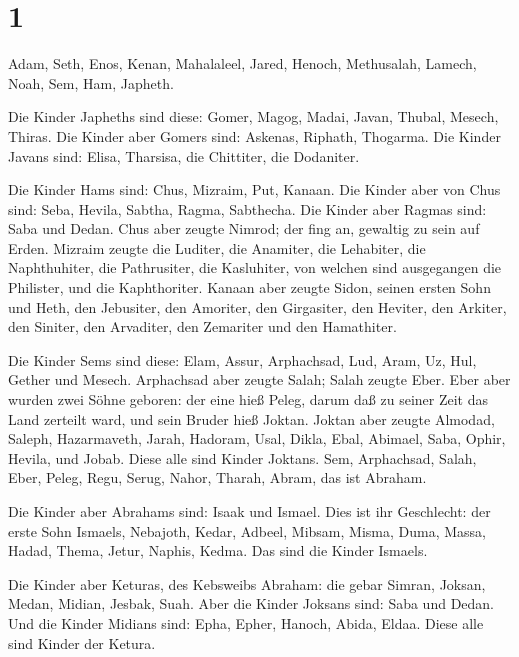 \hypertarget{section}{%
\section{1}\label{section}}

 Adam, Seth, Enos,  Kenan, Mahalaleel, Jared,
 Henoch, Methusalah, Lamech,  Noah, Sem, Ham,
Japheth.

 Die Kinder Japheths sind diese: Gomer, Magog, Madai, Javan,
Thubal, Mesech, Thiras.  Die Kinder aber Gomers sind:
Askenas, Riphath, Thogarma.  Die Kinder Javans sind: Elisa,
Tharsisa, die Chittiter, die Dodaniter.

 Die Kinder Hams sind: Chus, Mizraim, Put, Kanaan.
 Die Kinder aber von Chus sind: Seba, Hevila, Sabtha, Ragma,
Sabthecha. Die Kinder aber Ragmas sind: Saba und Dedan. 
Chus aber zeugte Nimrod; der fing an, gewaltig zu sein auf Erden.
 Mizraim zeugte die Luditer, die Anamiter, die Lehabiter,
die Naphthuhiter,  die Pathrusiter, die Kasluhiter, von
welchen sind ausgegangen die Philister, und die Kaphthoriter.
 Kanaan aber zeugte Sidon, seinen ersten Sohn und Heth,
 den Jebusiter, den Amoriter, den Girgasiter, 
den Heviter, den Arkiter, den Siniter,  den Arvaditer, den
Zemariter und den Hamathiter.

 Die Kinder Sems sind diese: Elam, Assur, Arphachsad, Lud,
Aram, Uz, Hul, Gether und Mesech.  Arphachsad aber zeugte
Salah; Salah zeugte Eber.  Eber aber wurden zwei Söhne
geboren: der eine hieß Peleg, darum daß zu seiner Zeit das Land zerteilt
ward, und sein Bruder hieß Joktan.  Joktan aber zeugte
Almodad, Saleph, Hazarmaveth, Jarah,  Hadoram, Usal, Dikla,
 Ebal, Abimael, Saba,  Ophir, Hevila, und
Jobab. Diese alle sind Kinder Joktans.  Sem, Arphachsad,
Salah,  Eber, Peleg, Regu,  Serug, Nahor,
Tharah,  Abram, das ist Abraham.

 Die Kinder aber Abrahams sind: Isaak und Ismael.
 Dies ist ihr Geschlecht: der erste Sohn Ismaels, Nebajoth,
Kedar, Adbeel, Mibsam,  Misma, Duma, Massa, Hadad, Thema,
 Jetur, Naphis, Kedma. Das sind die Kinder Ismaels.

 Die Kinder aber Keturas, des Kebsweibs Abraham: die gebar
Simran, Joksan, Medan, Midian, Jesbak, Suah. Aber die Kinder Joksans
sind: Saba und Dedan.  Und die Kinder Midians sind: Epha,
Epher, Hanoch, Abida, Eldaa. Diese alle sind Kinder der Ketura.

